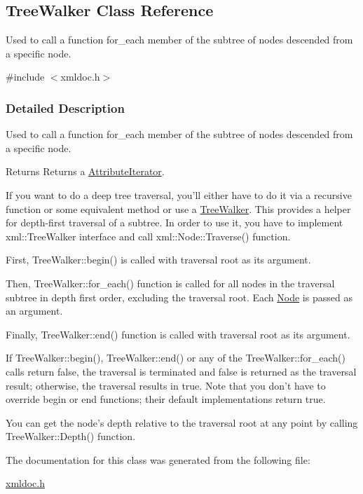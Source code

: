 \hypertarget{classTreeWalker}{
\subsection{TreeWalker Class Reference}
\label{classTreeWalker}
}


Used to call a function for\_\-each member of the subtree of nodes descended from a specific node.  




{\ttfamily \#include $<$xmldoc.h$>$}



\subsubsection{Detailed Description}
Used to call a function for\_\-each member of the subtree of nodes descended from a specific node. \begin{DoxyReturn}{Returns}
Returns a \hyperlink{classAttributeIterator}{AttributeIterator}.
\end{DoxyReturn}
If you want to do a deep tree traversal, you'll either have to do it via a recursive function or some equivalent method or use a \hyperlink{classTreeWalker}{TreeWalker}. This provides a helper for depth-\/first traversal of a subtree. In order to use it, you have to implement xml::TreeWalker interface and call xml::Node::Traverse() function. \par
\par
 First, TreeWalker::begin() is called with traversal root as its argument.\par
 Then, TreeWalker::for\_\-each() function is called for all nodes in the traversal subtree in depth first order, excluding the traversal root. Each \hyperlink{classNode}{Node} is passed as an argument.\par
 Finally, TreeWalker::end() function is called with traversal root as its argument.\par
\par
 If TreeWalker::begin(), TreeWalker::end() or any of the TreeWalker::for\_\-each() calls return false, the traversal is terminated and false is returned as the traversal result; otherwise, the traversal results in true. Note that you don't have to override begin or end functions; their default implementations return true.\par
\par
 You can get the node's depth relative to the traversal root at any point by calling TreeWalker::Depth() function. 

The documentation for this class was generated from the following file:\begin{DoxyCompactItemize}
\item 
\hyperlink{xmldoc_8h}{xmldoc.h}\end{DoxyCompactItemize}
